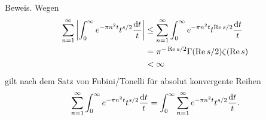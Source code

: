 \begin{frame}
    \begin{block}{Beweis.}%
    Wegen
    \begin{align*}
        \sum_{n = 1}^{\infty} \left|\int_0^\infty e^{-\pi n^2 t}t^{s/2} \frac{\mathrm{d} t}{t}\right| &\leq \sum_{n = 1}^{\infty} \int_0^\infty e^{-\pi n^2 t}t^{\operatorname{Re} s/2} \frac{\mathrm{d} t}{t}\\
        &= \pi^{- \operatorname{Re} s/2} \Gamma(\operatorname{Re} s/2)\zeta(\operatorname{Re} s)\\
        &< \infty
    \end{align*}
    gilt nach dem Satz von Fubini/Tonelli für absolut konvergente Reihen
    \[
        \sum_{n = 1}^{\infty} \int_0^\infty e^{-\pi n^2 t}t^{s/2} \frac{\mathrm{d} t}{t} = \int_0^\infty \sum_{n = 1}^{\infty} e^{-\pi n^2 t}t^{s/2} \frac{\mathrm{d} t}{t}.
    \]
    \end{block}
\end{frame}